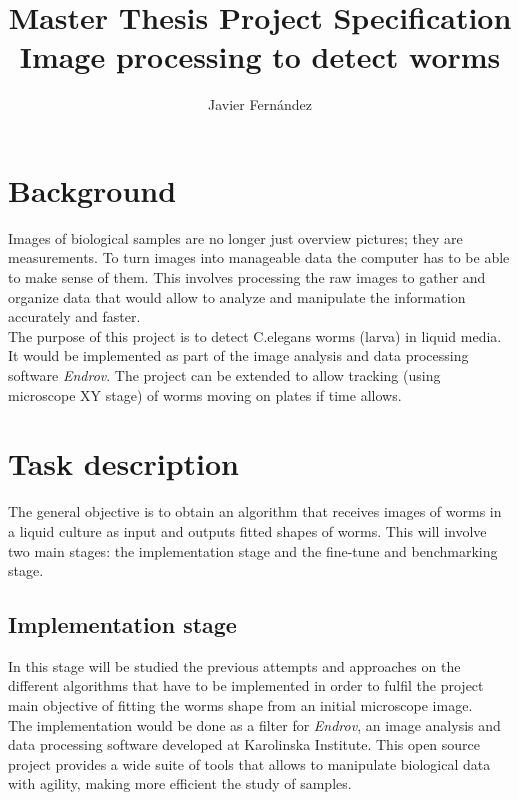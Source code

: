 \documentclass{article}
\begin{document}
\title{Master Thesis Project Specification\\
\textbf{Image processing to detect worms}}
\author{Javier Fern\'andez}
\maketitle



\section{Background}
Images of biological samples are no longer just overview pictures; 
they are measurements. To turn images into manageable data the computer 
has to be able to make sense of them. This involves processing the raw 
images to gather and organize data that would allow to analyze and 
manipulate the information accurately and faster.\\

 The purpose of this project is to detect C.elegans worms (larva) in 
liquid media. It would be implemented as part of the 
image analysis and data processing software \emph{Endrov}. 
The project can be extended to allow tracking 
(using microscope XY stage) of worms moving on plates if time allows.

\section{Task description}
The general objective is to obtain an algorithm that receives images of
worms in a liquid culture as input and outputs fitted shapes of worms.
This will involve two main stages: the implementation stage and the fine-tune
and benchmarking stage.\\

\subsection{Implementation stage}
In this stage will be studied the previous attempts and approaches
on the different algorithms that have to be implemented in order to fulfil
the project main objective of fitting the worms shape from an initial
microscope image.\\

The implementation would be done as a filter for \emph{Endrov}, an 
image analysis and data processing software developed at Karolinska
Institute. This open source project provides a wide suite of tools that
allows to manipulate biological data with agility, making more efficient
the study of samples.\\
\end{document}
